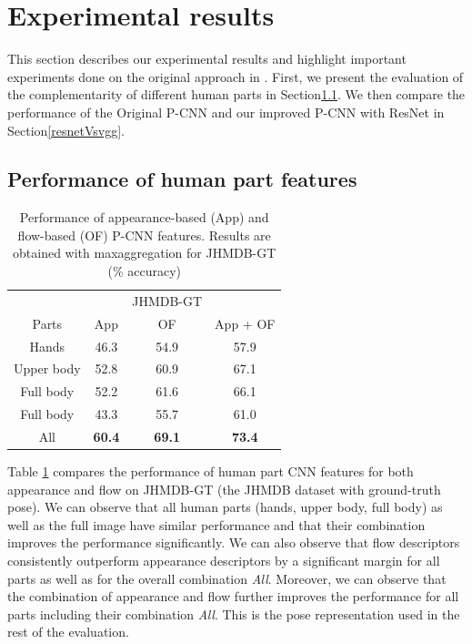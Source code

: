 \documentclass[10pt,twocolumn,letterpaper]{article}
\begin{document}
\section{Experimental results}
\label{results}
This section describes our experimental results and highlight important experiments done on the original approach in \cite{cheron2015p}. First, we present the evaluation of the complementarity of different human parts in Section\ref{diffParts}. We then compare the performance of the Original P-CNN and our improved P-CNN with ResNet in Section\ref{resnetVsvgg}. 

\subsection{Performance of human part features}
\label{diffParts}
\begin{table}
	
	\begin{center}
		\begin{tabular}{cccc}
			\hline
			& & JHMDB-GT\\ [0.5ex] 
			\cline{2-4}
			Parts & App & OF & App + OF \\ [0.5ex]
			\hline
			Hands & 46.3 & 54.9 & 57.9\\
			Upper body  & 52.8 & 60.9 & 67.1\\
			Full body  & 52.2 & 61.6 & 66.1\\
			Full body  & 43.3 & 55.7 & 61.0\\
			All  & \textbf{60.4} & \textbf{69.1} & \textbf{73.4}\\
			\hline
		\end{tabular}
	\end{center}
	\caption{Performance of appearance-based (App) and flow-based (OF) P-CNN features. Results are obtained with maxaggregation for JHMDB-GT (\% accuracy)}
	\label{table:diffparts}
\end{table}

Table \ref{table:diffparts} compares the performance of human part CNN features for both appearance and flow on JHMDB-GT (the JHMDB dataset with ground-truth pose). We can observe that all human parts (hands, upper body, full body) as well as the full image have similar performance and that their combination improves the performance significantly. We can also observe that flow descriptors consistently outperform appearance descriptors by a significant margin for all parts as well as for the overall combination \textit{All}. Moreover, we can observe that the combination of appearance and flow further improves the performance for all parts including their combination \textit{All}. This is the pose representation used in the rest of the evaluation.
\end{document}
